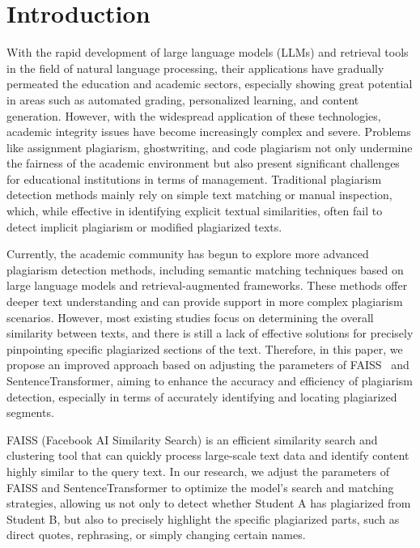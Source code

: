 \usepackage{enumitem}
\section{Introduction}
With the rapid development of large language models (LLMs) and retrieval tools in the field of natural language processing, their applications have gradually permeated the education and academic sectors, especially showing great potential in areas such as automated grading, personalized learning, and content generation. However, with the widespread application of these technologies, academic integrity issues have become increasingly complex and severe. Problems like assignment plagiarism, ghostwriting, and code plagiarism not only undermine the fairness of the academic environment but also present significant challenges for educational institutions in terms of management. Traditional plagiarism detection methods mainly rely on simple text matching or manual inspection, which, while effective in identifying explicit textual similarities, often fail to detect implicit plagiarism or modified plagiarized texts.

Currently, the academic community has begun to explore more advanced plagiarism detection methods, including semantic matching techniques based on large language models and retrieval-augmented frameworks. These methods offer deeper text understanding and can provide support in more complex plagiarism scenarios. However, most existing studies focus on determining the overall similarity between texts, and there is still a lack of effective solutions for precisely pinpointing specific plagiarized sections of the text. Therefore, in this paper, we propose an improved approach based on adjusting the parameters of FAISS~\cite{FAISS} and SentenceTransformer, aiming to enhance the accuracy and efficiency of plagiarism detection, especially in terms of accurately identifying and locating plagiarized segments.

FAISS (Facebook AI Similarity Search) is an efficient similarity search and clustering tool that can quickly process large-scale text data and identify content highly similar to the query text. In our research, we adjust the parameters of FAISS and SentenceTransformer to optimize the model's search and matching strategies, allowing us not only to detect whether Student A has plagiarized from Student B, but also to precisely highlight the specific plagiarized parts, such as direct quotes, rephrasing, or simply changing certain names.

